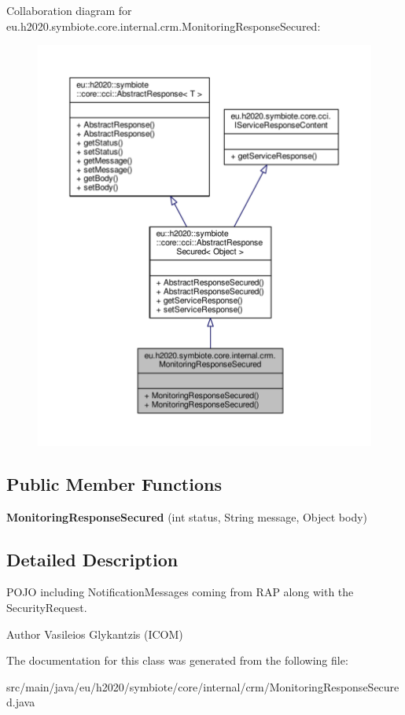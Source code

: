 Collaboration diagram for eu.\+h2020.\+symbiote.\+core.\+internal.\+crm.\+Monitoring\+Response\+Secured\+:\nopagebreak
\begin{figure}[H]
\begin{center}
\leavevmode
\includegraphics[width=350pt]{classeu_1_1h2020_1_1symbiote_1_1core_1_1internal_1_1crm_1_1MonitoringResponseSecured__coll__graph}
\end{center}
\end{figure}
\subsection*{Public Member Functions}
\begin{DoxyCompactItemize}
\item 
\mbox{\label{classeu_1_1h2020_1_1symbiote_1_1core_1_1internal_1_1crm_1_1MonitoringResponseSecured_ab002921a1973672d90eb938c6f0070f2}} 
{\bfseries Monitoring\+Response\+Secured} (int status, String message, Object body)
\end{DoxyCompactItemize}


\subsection{Detailed Description}
P\+O\+JO including Notification\+Messages coming from R\+AP along with the Security\+Request. \begin{DoxyAuthor}{Author}
Vasileios Glykantzis (I\+C\+OM) 
\end{DoxyAuthor}


The documentation for this class was generated from the following file\+:\begin{DoxyCompactItemize}
\item 
src/main/java/eu/h2020/symbiote/core/internal/crm/Monitoring\+Response\+Secured.\+java\end{DoxyCompactItemize}
